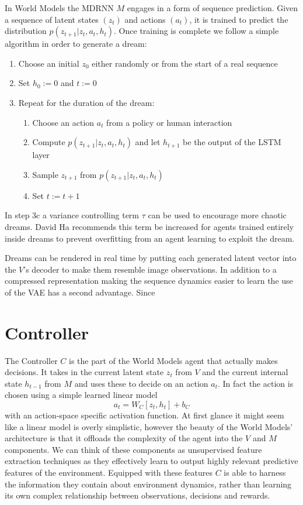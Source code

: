 \documentclass{article}
\numberwithin{figure}{section}
\theoremstyle{definition}
\begin{document}
In World Models the MDRNN $M$ engages in a form of sequence prediction.
Given a sequence of latent states $(z_t)$ and actions $(a_t)$, it is trained to predict the distribution $p(z_{t+1} | z_t, a_t, h_t)$.
Once training is complete we follow a simple algorithm in order to generate a dream:
\begin{enumerate}
  \item Choose an initial $z_0$ either randomly or from the start of a real sequence 
  \item Set $h_0 := 0$ and $t:=0$
  \item Repeat for the duration of the dream:
  \begin{enumerate}
    \item Choose an action $a_t$ from a policy or human interaction
    \item Compute $p(z_{t+1} | z_t, a_t, h_t)$ and let $h_{t+1}$ be the output of the LSTM layer
    \item Sample $z_{t+1}$ from $p(z_{t+1} | z_t, a_t, h_t)$
    \item Set $t := t+1$
  \end{enumerate}
\end{enumerate}
In step 3c a variance controlling term $\tau$ can be used to encourage more chaotic dreams.
David Ha recommends this term be increased for agents trained entirely inside dreams to prevent overfitting from an agent learning to exploit the dream.

Dreams can be rendered in real time by putting each generated latent vector into the $V$'s decoder to make them resemble image observations.
In addition to a compressed representation making the sequence dynamics easier to learn the use of the VAE has a second advantage.
Since



\section{Controller}
The Controller $C$ is the part of the World Models agent that actually makes decisions.
It takes in the current latent state $z_t$ from $V$ and the current internal state $h_{t-1}$ from $M$ and uses these to decide on an action $a_t$.
In fact the action is chosen using a simple learned linear model
$$a_t = W_C [z_t, h_t] + b_C$$
with an action-space specific activation function.
At first glance it might seem like a linear model is overly simplistic, however the beauty of the World Models' architecture is that it offloads the complexity of the agent into the $V$ and $M$ components.
We can think of these components as unsupervised feature extraction techniques as they effectively learn to output highly relevant predictive features of the environment.
Equipped with these features $C$ is able to harness the information they contain about environment dynamics, rather than learning its own complex relationship between observations, decisions and rewards.
\end{document}
